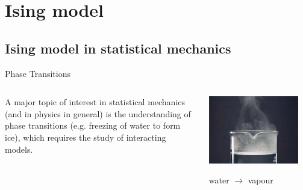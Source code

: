 \section{Ising model}

\subsection{Ising model in statistical mechanics}

\begin{frame}{Phase Transitions}
	\begin{columns}
		\begin{column}{0.5\textwidth}
			A major topic of interest in statistical mechanics (and in physics in general) is the understanding of \alert{phase transitions} (e.g. freezing of water to form ice), which requires the study of \alert{interacting models}.
		\end{column}
		
		\begin{column}{0.5\textwidth}
			\includegraphics[width = 0.9\textwidth]{Figures/phase.jpeg}
			\centerline{water $\longrightarrow$ vapour}
		\end{column}
	\end{columns}
\end{frame}

